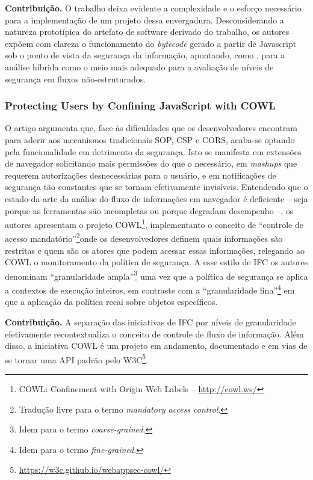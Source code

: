 \textbf{Contribuição.} O trabalho deixa evidente a complexidade e o esforço necessário para a implementação de um projeto dessa envergadura. Desconsiderando a natureza prototípica do artefato de software derivado do trabalho, os autores expõem com clareza o funcionamento do \textit{bytecode} gerado a partir de Javascript sob o ponto de vista da segurança da informação, apontando, como \cite{Hedin2014}, para a análise híbrida como o meio mais adequado para a avaliação de níveis de segurança em fluxos não-estruturados.


\subsubsection{Protecting Users by Confining JavaScript with COWL \cite{Stefan2014}}
O artigo argumenta que, face às dificuldades que os desenvolvedores encontram para aderir aos mecanismos tradicionais SOP, CSP e CORS, acaba-se optando pela funcionalidade em detrimento da segurança. Isto se manifesta em extensões de navegador solicitando mais permissões do que o necessário, em \textit{mashups} que requerem autorizações desnecessárias para o usuário, e em notificações de segurança tão constantes que se tornam efetivamente invisíveis. Entendendo que o estado-da-arte da análise do fluxo de informações em navegador é deficiente -- seja porque as ferramentas são incompletas ou porque degradam desempenho --, os autores apresentam o projeto COWL\footnote{COWL: Confinement with Origin Web Labels -- \url{http://cowl.ws/}}, implementanto o conceito de ``controle de acesso mandatório''\footnote{Tradução livre para o termo \textit{mandatory access control}.}onde os desenvolvedores definem quais informações são restritas e quem são os atores que podem acessar essas informações, relegando ao COWL o monitoramento da política de segurança. A esse estilo de IFC os autores denominam ``granularidade ampla''\footnote{Idem para o termo \textit{coarse-grained}.} uma vez que a política de segurança se aplica a contextos de execução inteiros, em contraste com a ``granularidade fina''\footnote{Idem para o termo \textit{fine-grained}.} em que a aplicação da política recai sobre objetos específicos.

\textbf{Contribuição.} A separação das iniciativas de IFC por níveis de granularidade efetivamente recontextualiza o conceito de controle de fluxo de informação. Além disso, a iniciativa COWL é um projeto em andamento, documentado e em vias de se tornar uma API padrão pelo W3C\footnote{\url{https://w3c.github.io/webappsec-cowl/}}.



